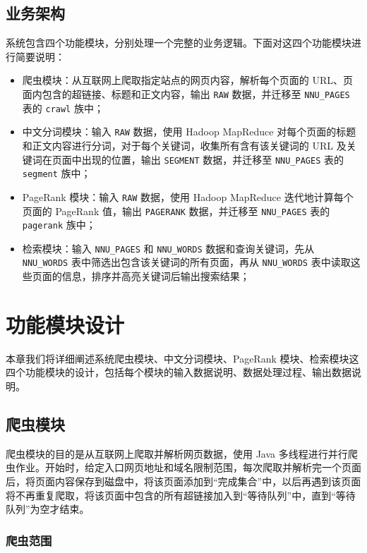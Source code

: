 \documentclass{ctexart}
\newcommand{\code}[1]{\colorbox{backcolor}{\lstinline|#1|}}
\begin{document}
    \subsection{业务架构}\label{subsec:crawl}

    系统包含四个功能模块，分别处理一个完整的业务逻辑。下面对这四个功能模块进行简要说明：

    \begin{itemize}
        \item 爬虫模块：从互联网上爬取指定站点的网页内容，解析每个页面的 URL、页面内包含的超链接、标题和正文内容，输出 \code{RAW} 数据，并迁移至 \code{NNU_PAGES} 表的 \code{crawl} 族中；
        \item 中文分词模块：输入 \code{RAW} 数据，使用 Hadoop MapReduce 对每个页面的标题和正文内容进行分词，对于每个关键词，收集所有含有该关键词的 URL 及关键词在页面中出现的位置，输出 \code{SEGMENT} 数据，并迁移至 \code{NNU_PAGES} 表的 \code{segment} 族中；
        \item PageRank 模块：输入 \code{RAW} 数据，使用 Hadoop MapReduce 迭代地计算每个页面的 PageRank 值，输出 \code{PAGERANK} 数据，并迁移至 \code{NNU_PAGES} 表的 \code{pagerank} 族中；
        \item 检索模块：输入 \code{NNU_PAGES} 和 \code{NNU_WORDS} 数据和查询关键词，先从 \code{NNU_WORDS} 表中筛选出包含该关键词的所有页面，再从 \code{NNU_WORDS} 表中读取这些页面的信息，排序并高亮关键词后输出搜索结果；
    \end{itemize}


    \section{功能模块设计}\label{sec:modules}

    本章我们将详细阐述系统爬虫模块、中文分词模块、PageRank 模块、检索模块这四个功能模块的设计，包括每个模块的输入数据说明、数据处理过程、输出数据说明。

    \subsection{爬虫模块}\label{subsec:crawl}

    爬虫模块的目的是从互联网上爬取并解析网页数据，使用 Java 多线程进行并行爬虫作业。开始时，给定入口网页地址和域名限制范围，每次爬取并解析完一个页面后，将页面内容保存到磁盘中，将该页面添加到“完成集合”中，以后再遇到该页面将不再重复爬取，将该页面中包含的所有超链接加入到“等待队列”中，直到“等待队列”为空才结束。

    \subsubsection{爬虫范围}\label{subsubsec:crawl_scope}
\end{document}
